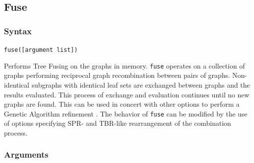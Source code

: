 \subsection{Fuse}
	\subsubsection{Syntax}
		\texttt{fuse([argument list])}
		
	\begin{phygdescription}
	
		{Performs Tree Fusing \citep{goloboff1999, moilanen1999, moilanen2001} on the graphs
		in memory. \texttt{fuse} operates on a collection of graphs performing reciprocal graph 
		recombination between pairs of graphs. Non-identical subgraphs with identical leaf sets 
		are exchanged between graphs and the results evaluated. This process of exchange 
		and evaluation continues until no new graphs are found. This can be used in concert 
		with other options to perform a Genetic Algorithm refinement \citep{Holland1975}. The 
		behavior of \texttt{fuse} can be modified by the use of options specifying SPR- and 
		TBR-like rearrangement of the combination process.}
		
	\end{phygdescription}
	
	\subsubsection{Arguments}
	
